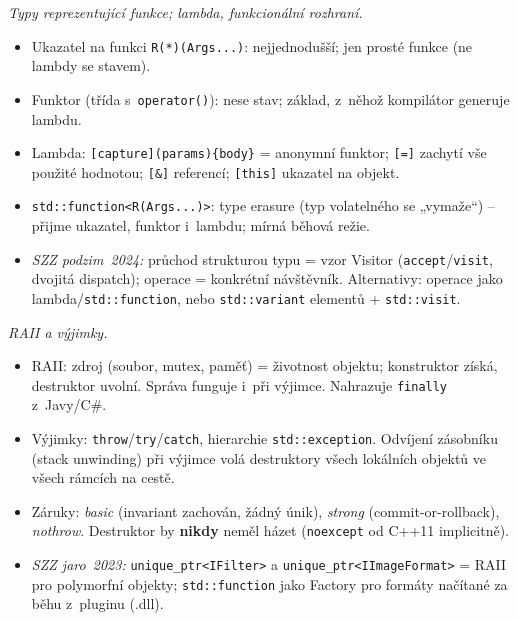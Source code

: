 \documentclass[11pt,a4paper]{article}
\newcommand{\cd}{\lstinline[style=cpp]}
\begin{document}
\begin{poznamka}
\smallskip
\emph{Typy reprezentující funkce; lambda, funkcionální rozhraní.}
\begin{itemize}
  \item Ukazatel na funkci \cd{R(*)(Args...)}: nejjednodušší; jen prosté funkce (ne lambdy se stavem).
  \item Funktor (třída s~\cd{operator()}): nese stav; základ, z~něhož kompilátor generuje lambdu.
  \item Lambda: \lstinline[style=cpp]![capture](params){body}! = anonymní funktor; \texttt{[=]} zachytí vše použité hodnotou; \texttt{[\&]} referencí; \texttt{[this]} ukazatel na objekt.
  \item \cd{std::function<R(Args...)>}: type erasure (typ volatelného se „vymaže``) -- přijme ukazatel, funktor i~lambdu; mírná běhová režie.
  \item \emph{SZZ podzim~2024:} průchod strukturou typu = vzor Visitor (\texttt{accept}/\texttt{visit}, dvojitá dispatch); operace = konkrétní návštěvník. Alternativy: operace jako lambda/\cd{std::function}, nebo \cd{std::variant} elementů + \cd{std::visit}.
\end{itemize}

\smallskip
\emph{RAII a výjimky.}
\begin{itemize}
  \item RAII: zdroj (soubor, mutex, paměť) = životnost objektu; konstruktor získá, destruktor uvolní. Správa funguje i~při výjimce. Nahrazuje \texttt{finally} z~Javy/C\#.
  \item Výjimky: \cd{throw}/\cd{try}/\cd{catch}, hierarchie \cd{std::exception}. Odvíjení zásobníku (stack unwinding) při výjimce volá destruktory všech lokálních objektů ve všech rámcích na cestě.
  \item Záruky: \emph{basic} (invariant zachován, žádný únik), \emph{strong} (commit-or-rollback), \emph{nothrow}. Destruktor by \textbf{nikdy} neměl házet (\cd{noexcept} od C++11 implicitně).
  \item \emph{SZZ jaro~2023:} \cd{unique_ptr<IFilter>} a \cd{unique_ptr<IImageFormat>} = RAII pro polymorfní objekty; \cd{std::function} jako Factory pro formáty načítané za běhu z~pluginu (.dll).
\end{itemize}


\end{poznamka}
\end{document}
